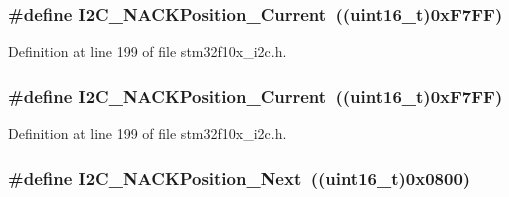 \subsubsection[{\texorpdfstring{I2\+C\+\_\+\+N\+A\+C\+K\+Position\+\_\+\+Current}{I2C_NACKPosition_Current}}]{\setlength{\rightskip}{0pt plus 5cm}\#define I2\+C\+\_\+\+N\+A\+C\+K\+Position\+\_\+\+Current~(({\bf uint16\+\_\+t})0x\+F7\+F\+F)}\hypertarget{group___i2_c___n_c_a_k__position_ga8d91c1e62730a9d927ca8e9ec4f7ef8f}{}\label{group___i2_c___n_c_a_k__position_ga8d91c1e62730a9d927ca8e9ec4f7ef8f}


Definition at line 199 of file stm32f10x\+\_\+i2c.\+h.

\subsubsection[{\texorpdfstring{I2\+C\+\_\+\+N\+A\+C\+K\+Position\+\_\+\+Current}{I2C_NACKPosition_Current}}]{\setlength{\rightskip}{0pt plus 5cm}\#define I2\+C\+\_\+\+N\+A\+C\+K\+Position\+\_\+\+Current~(({\bf uint16\+\_\+t})0x\+F7\+F\+F)}\hypertarget{group___i2_c___n_c_a_k__position_ga8d91c1e62730a9d927ca8e9ec4f7ef8f}{}\label{group___i2_c___n_c_a_k__position_ga8d91c1e62730a9d927ca8e9ec4f7ef8f}


Definition at line 199 of file stm32f10x\+\_\+i2c.\+h.

\subsubsection[{\texorpdfstring{I2\+C\+\_\+\+N\+A\+C\+K\+Position\+\_\+\+Next}{I2C_NACKPosition_Next}}]{\setlength{\rightskip}{0pt plus 5cm}\#define I2\+C\+\_\+\+N\+A\+C\+K\+Position\+\_\+\+Next~(({\bf uint16\+\_\+t})0x0800)}\hypertarget{group___i2_c___n_c_a_k__position_gacb512a4bd4841a763b6ec51606687fca}{}\label{group___i2_c___n_c_a_k__position_gacb512a4bd4841a763b6ec51606687fca}


